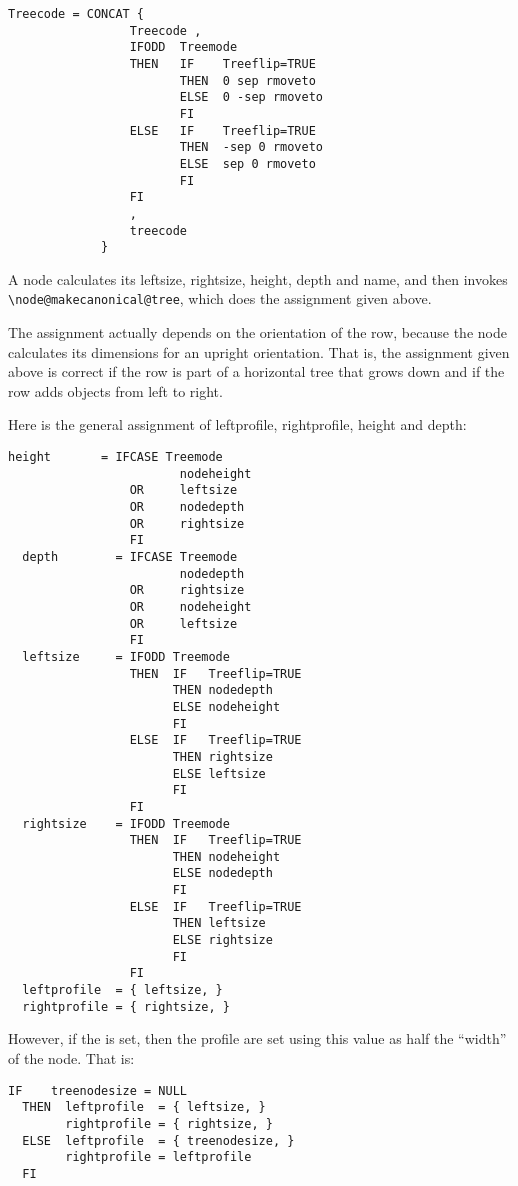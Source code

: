 \documentclass[11pt,english,BCOR10mm,DIV12,bibliography=totoc,parskip=false,smallheadings
    headexclude,footexclude,oneside]{pst-doc}
\begin{document}
\begin{lstlisting}[style=syntax]
  Treecode = CONCAT {
                 Treecode ,
                 IFODD  Treemode
                 THEN   IF    Treeflip=TRUE
                        THEN  0 sep rmoveto
                        ELSE  0 -sep rmoveto
                        FI
                 ELSE   IF    Treeflip=TRUE
                        THEN  -sep 0 rmoveto
                        ELSE  sep 0 rmoveto
                        FI
                 FI
                 ,
                 treecode
             }
\end{lstlisting}

A node calculates its leftsize, rightsize, height, depth and name, and then invokes 
\verb=\node@makecanonical@tree=, which does the assignment given above.

The assignment actually depends on the orientation of the row, because the node calculates its 
dimensions for an upright orientation. That is, the assignment given above is correct if the row 
is part of a horizontal tree that grows down and if the row adds objects from left to right.

Here is the general assignment of leftprofile, rightprofile, height and depth: 
\begin{lstlisting}[style=syntax]
  height       = IFCASE Treemode
                        nodeheight
                 OR     leftsize
                 OR     nodedepth
                 OR     rightsize
                 FI
  depth        = IFCASE Treemode
                        nodedepth
                 OR     rightsize
                 OR     nodeheight
                 OR     leftsize
                 FI
  leftsize     = IFODD Treemode
                 THEN  IF   Treeflip=TRUE
                       THEN nodedepth
                       ELSE nodeheight
                       FI
                 ELSE  IF   Treeflip=TRUE
                       THEN rightsize
                       ELSE leftsize
                       FI
                 FI
  rightsize    = IFODD Treemode
                 THEN  IF   Treeflip=TRUE
                       THEN nodeheight
                       ELSE nodedepth
                       FI
                 ELSE  IF   Treeflip=TRUE
                       THEN leftsize
                       ELSE rightsize
                       FI
                 FI
  leftprofile  = { leftsize, }
  rightprofile = { rightsize, }
\end{lstlisting}

However, if the  is set, then the profile are set using this value as half the ``width'' of the node. That is:
\begin{lstlisting}[style=syntax]
  IF    treenodesize = NULL
  THEN  leftprofile  = { leftsize, }
        rightprofile = { rightsize, }
  ELSE  leftprofile  = { treenodesize, }
        rightprofile = leftprofile
  FI
\end{lstlisting}
\end{document}
